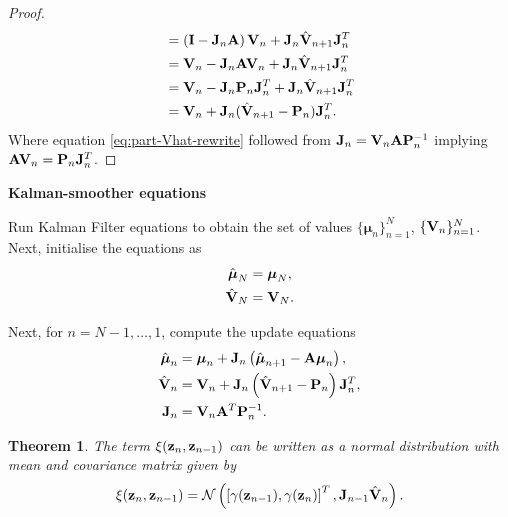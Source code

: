 \documentclass[11pt]{article}
\numberwithin{equation}{section}
\newcommand{\z}{{\bf z}}
\newcommand{\N}{\mathcal{N}}
\newtheorem{theorem}{Theorem}[section]
\begin{document}
\begin{proof}
\begin{align}
		&= \left({\bf I} - {\bf J}_n{\bf A}\right){\bf V}_n + {\bf J}_n\hat{\bf V}_{n+1}{\bf J}_n^T\\
		&= {\bf V}_n - {\bf J}_n{\bf A}{\bf V}_n + {\bf J}_n\hat{\bf V}_{n+1}{\bf J}_n^T\\
		&= {\bf V}_n - {\bf J}_n{\bf P}_n{\bf J}_n^T + {\bf J}_n\hat{\bf V}_{n+1}{\bf J}_n^T \label{eq:part-Vhat-rewrite} \\
		&= {\bf V}_n + {\bf J}_n(\hat{\bf V}_{n+1} - {\bf P}_n){\bf J}_n^T.
	\end{align}
	Where equation \eqref{eq:part-Vhat-rewrite} followed from ${\bf J}_n = {\bf V}_n{\bf A}{\bf P}_n^{-1}$ implying ${\bf AV}_n = {\bf P}_n{\bf J}_n^T$.
\end{proof}

\begin{tcolorbox}
\textbf{Kalman-smoother equations}

	Run Kalman Filter equations to obtain the set of values $\{\boldsymbol\mu_n\}_{n=1}^N$, $\{{\bf V}_n\}_{n=1}^N$. Next, initialise the equations as
	\begin{align}
		\hat{\boldsymbol{\mu}}_N &= \boldsymbol{\mu}_N,\\
		\hat{{\bf V}}_N &= {\bf V}_N.
	\end{align}

	Next, for $n=N-1, \ldots, 1$, compute the update equations
	\begin{align}
		\hat{\boldsymbol{\mu}}_n &= \boldsymbol{\mu}_n + {\bf J}_n\left(\hat{\boldsymbol \mu}_{n+1} - {\bf A}\boldsymbol\mu_n\right),\\
		\hat{\bf V}_n &= {\bf V}_n + {\bf J}_n\left(\hat{\bf V}_{n+1} - {\bf P}_n\right){\bf J}_n^T,\\
		{\bf J}_n &= {\bf V}_n{\bf A}^T{\bf P}_n^{-1}.
	\end{align}
\end{tcolorbox}

\begin{theorem}
	The term $\xi(\z_n, \z_{n-1})$ can be written as a normal distribution with mean and covariance matrix given by
	\begin{equation}
		\xi(\z_n, \z_{n-1}) = \N\left(\left[\gamma(\z_{n-1}), \gamma(\z_{n})\right]^T, {\bf J}_{n-1}\hat{\bf V}_{n}\right).
	\end{equation}
\end{theorem}
\end{document}
